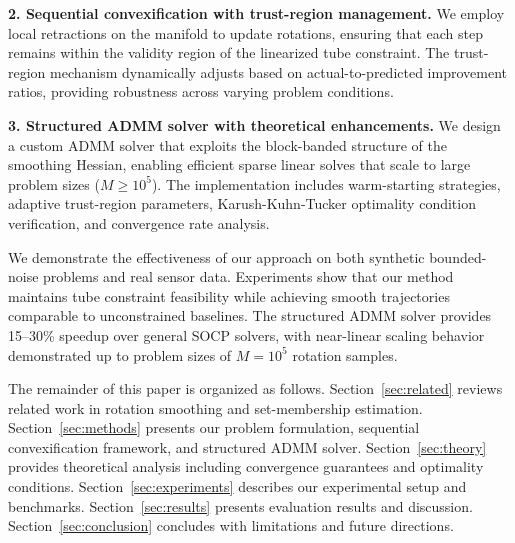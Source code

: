 \textbf{2. Sequential convexification with trust-region management.} We employ local retractions on the manifold to update rotations, ensuring that each step remains within the validity region of the linearized tube constraint. The trust-region mechanism dynamically adjusts based on actual-to-predicted improvement ratios, providing robustness across varying problem conditions.

\textbf{3. Structured ADMM solver with theoretical enhancements.} We design a custom ADMM solver that exploits the block-banded structure of the smoothing Hessian, enabling efficient sparse linear solves that scale to large problem sizes ($M \geq 10^5$). The implementation includes warm-starting strategies, adaptive trust-region parameters, Karush-Kuhn-Tucker optimality condition verification, and convergence rate analysis.

We demonstrate the effectiveness of our approach on both synthetic bounded-noise problems and real sensor data. Experiments show that our method maintains tube constraint feasibility while achieving smooth trajectories comparable to unconstrained baselines. The structured ADMM solver provides 15--30\% speedup over general SOCP solvers, with near-linear scaling behavior demonstrated up to problem sizes of $M = 10^5$ rotation samples.

The remainder of this paper is organized as follows. Section~\ref{sec:related} reviews related work in rotation smoothing and set-membership estimation. Section~\ref{sec:methods} presents our problem formulation, sequential convexification framework, and structured ADMM solver. Section~\ref{sec:theory} provides theoretical analysis including convergence guarantees and optimality conditions. Section~\ref{sec:experiments} describes our experimental setup and benchmarks. Section~\ref{sec:results} presents evaluation results and discussion. Section~\ref{sec:conclusion} concludes with limitations and future directions.
